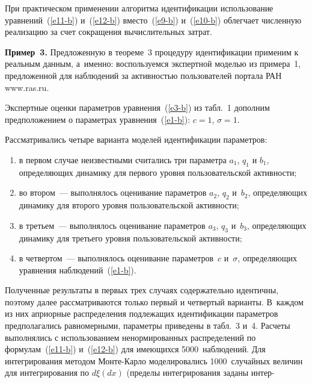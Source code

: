 \begin{multicols}{2}
  При практическом применении алгоритма идентификации использование 
уравнений~(\ref{e11-b}) и~(\ref{e12-b}) вместо~(\ref{e9-b}) и~(\ref{e10-b}) облегчает численную 
реализацию за счет сокращения вычислительных затрат.
  
  \smallskip
  
  \noindent
  \textbf{Пример~3.} Предложенную в теореме~3 процедуру идентификации применим к 
реальным данным, а~именно: воспользуемся экспертной моделью из примера~1, 
предложенной для наблюдений за активностью пользователей портала 
РАН {\sf www.ras.ru}.\linebreak\vspace*{-12pt}
\pagebreak

\noindent
 
Экспертные оценки параметров уравнения~(\ref{e3-b}) из табл.~1 дополним 
предположением о параметрах уравнения~(\ref{e1-b}): $c=1$, $\sigma=1$.
  
  Рассматривались четыре варианта моделей идентификации параметров:
  \begin{enumerate}[(1)]
\item в первом случае неизвестными считались три параметра $a_1$, $q_1$ и $b_1$, 
определяющих динамику для первого уровня пользовательской ак\-тив\-ности;
\item во втором~--- выполнялось оценивание па\-ра\-мет\-ров $a_2$, $q_2$ и~$b_2$, 
определяющих динамику для второго уровня пользовательской активности;
\item в третьем~--- выполнялось оценивание па\-ра\-мет\-ров $a_3$, $q_3$ и~$b_3$, 
определяющих динамику для третьего уровня пользовательской активности;
\item в четвертом~--- выполнялось оценивание параметров~$c$ и~$\sigma$, определяющих 
уравнения наблюдений~(\ref{e1-b}).
  \end{enumerate}
  
  Полученные результаты в первых трех случаях содержательно идентичны, поэтому далее 
рас\-смат\-ри\-ва\-ют\-ся только первый и четвертый варианты. В~каж\-дом из них априорные 
распределения подлежащих идентификации параметров предполагались равномерными, 
параметры приведены в табл.~3 и~4. Расчеты выполнялись с использованием 
ненормированных распределений по формулам~(\ref{e11-b}) и~(\ref{e12-b}) для имеющихся 
5000~наблюдений. Для интегрирования методом Мон\-те-Кар\-ло моделировались 
1000~случайных величин для интегрирования 
по $d\xi(dx)$ (пределы интегрирования заданы 
интер-\linebreak\vspace*{-12pt}
\columnbreak


\end{multicols}
